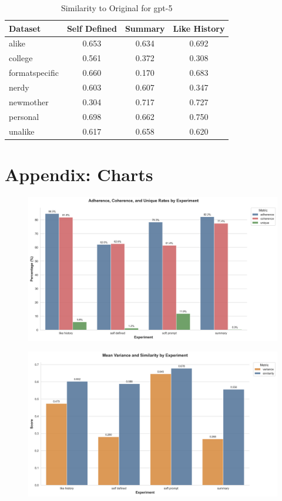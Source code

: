 \documentclass[11pt]{article}
\begin{document}
\begin{table}[H]
\centering
\caption{Similarity to Original for gpt-5}
\begin{tabular}{|l|c|c|c|}
\hline
\textbf{Dataset} & \textbf{Self Defined} & \textbf{Summary} & \textbf{Like History} \\
\hline
alike & 0.653 & 0.634 & 0.692 \\
\hline
college & 0.561 & 0.372 & 0.308 \\
\hline
formatspecific & 0.660 & 0.170 & 0.683 \\
\hline
nerdy & 0.603 & 0.607 & 0.347 \\
\hline
newmother & 0.304 & 0.717 & 0.727 \\
\hline
personal & 0.698 & 0.662 & 0.750 \\
\hline
unalike & 0.617 & 0.658 & 0.620 \\
\hline
\end{tabular}
\end{table}

\clearpage
\section{Appendix: Charts}

\begin{figure}[h]
    \centering
    \includegraphics[width=\linewidth]{visuals/acu-rates.png}
    \caption{}
    \label{fig:clustering-gemma-3-4b}
\end{figure}

\begin{figure}[h]
    \centering
    \includegraphics[width=\linewidth]{visuals/variance-similarity.png}
    \caption{}
    \label{fig:clustering-gemma-3-4b}
\end{figure}
\end{document}
